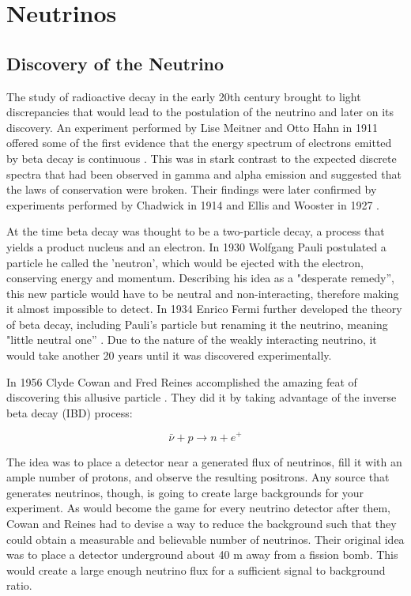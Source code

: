 \chapter{Neutrinos} \label{ch:Neutrinos}

\section{Discovery of the Neutrino} \label{sec:NeutrinoDiscovery}

The study of radioactive decay in the early 20th century brought to light discrepancies that would lead to the postulation of the neutrino and later on its discovery. 
An experiment performed by Lise Meitner and Otto Hahn in 1911 offered some of the first evidence that the energy spectrum of electrons emitted by beta decay is continuous \cite{Hahn:1911}. 
This was in stark contrast to the expected discrete spectra that had been observed in gamma and alpha emission and suggested that the laws of conservation were broken. 
Their findings were later confirmed by experiments performed by Chadwick in 1914 \cite{Chadwick:1914zz} and Ellis and Wooster in 1927 \cite{Ellis:1927}. 

At the time beta decay was thought to be a two-particle decay, a process that yields a product nucleus and an electron.
In 1930 Wolfgang Pauli postulated a particle he called the 'neutron', which would be ejected with the electron, conserving energy and momentum.
Describing his idea as a "desperate remedy'', this new particle would have to be neutral and non-interacting, therefore making it almost impossible to detect.
In 1934 Enrico Fermi further developed the theory of beta decay, including Pauli's particle but renaming it the neutrino, meaning "little neutral one'' \cite{Fermi:1934hr}.
Due to the nature of the weakly interacting neutrino, it would take another 20 years until it was discovered experimentally.

In 1956 Clyde Cowan and Fred Reines accomplished the amazing feat of discovering this allusive particle \cite{Cowan}. They did it by taking advantage of the inverse beta decay (IBD) process:

\begin{equation}
	\bar{\nu} + p \rightarrow n + e^{+}
\end{equation}

The idea was to place a detector near a generated flux of neutrinos, fill it with an ample number of protons, and observe the resulting positrons. 
Any source that generates neutrinos, though, is going to create large backgrounds for your experiment. 
As would become the game for every neutrino detector after them, Cowan and Reines had to devise a way to reduce the background such that they could obtain a measurable and believable number of neutrinos.
Their original idea was to place a detector underground about 40 m away from a fission bomb. 
This would create a large enough neutrino flux for a sufficient signal to background ratio. 


